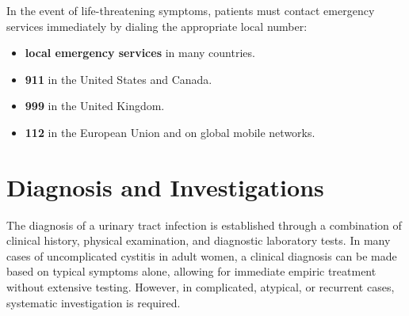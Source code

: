 In the event of life-threatening symptoms, patients must contact emergency services immediately by dialing the appropriate local number:
\begin{itemize}
    \item \textbf{local emergency services} in many countries.
    \item \textbf{911} in the United States and Canada.
    \item \textbf{999} in the United Kingdom.
    \item \textbf{112} in the European Union and on global mobile networks.
\end{itemize}

\section*{Diagnosis and Investigations}
The diagnosis of a urinary tract infection is established through a combination of clinical history, physical examination, and diagnostic laboratory tests. In many cases of uncomplicated cystitis in adult women, a clinical diagnosis can be made based on typical symptoms alone, allowing for immediate empiric treatment without extensive testing. However, in complicated, atypical, or recurrent cases, systematic investigation is required.

